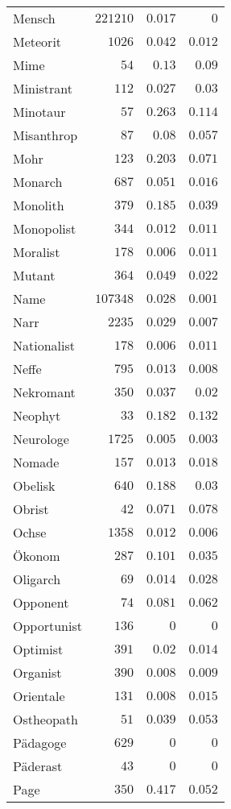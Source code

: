 \begin{supertabular}{lrrr}
Mensch & $221210$ & $0.017$ & $0$ \\
Meteorit & $1026$ & $0.042$ & $0.012$ \\
Mime & $54$ & $0.13$ & $0.09$ \\
Ministrant & $112$ & $0.027$ & $0.03$ \\
Minotaur & $57$ & $0.263$ & $0.114$ \\
Misanthrop & $87$ & $0.08$ & $0.057$ \\
Mohr & $123$ & $0.203$ & $0.071$ \\
Monarch & $687$ & $0.051$ & $0.016$ \\
Monolith & $379$ & $0.185$ & $0.039$ \\
Monopolist & $344$ & $0.012$ & $0.011$ \\
Moralist & $178$ & $0.006$ & $0.011$ \\
Mutant & $364$ & $0.049$ & $0.022$ \\
Name & $107348$ & $0.028$ & $0.001$ \\
Narr & $2235$ & $0.029$ & $0.007$ \\
Nationalist & $178$ & $0.006$ & $0.011$ \\
Neffe & $795$ & $0.013$ & $0.008$ \\
Nekromant & $350$ & $0.037$ & $0.02$ \\
Neophyt & $33$ & $0.182$ & $0.132$ \\
Neurologe & $1725$ & $0.005$ & $0.003$ \\
Nomade & $157$ & $0.013$ & $0.018$ \\
Obelisk & $640$ & $0.188$ & $0.03$ \\
Obrist & $42$ & $0.071$ & $0.078$ \\
Ochse & $1358$ & $0.012$ & $0.006$ \\
Ökonom & $287$ & $0.101$ & $0.035$ \\
Oligarch & $69$ & $0.014$ & $0.028$ \\
Opponent & $74$ & $0.081$ & $0.062$ \\
Opportunist & $136$ & $0$ & $0$ \\
Optimist & $391$ & $0.02$ & $0.014$ \\
Organist & $390$ & $0.008$ & $0.009$ \\
Orientale & $131$ & $0.008$ & $0.015$ \\
Ostheopath & $51$ & $0.039$ & $0.053$ \\
Pädagoge & $629$ & $0$ & $0$ \\
Päderast & $43$ & $0$ & $0$ \\
Page & $350$ & $0.417$ & $0.052$ \\

\end{supertabular}
